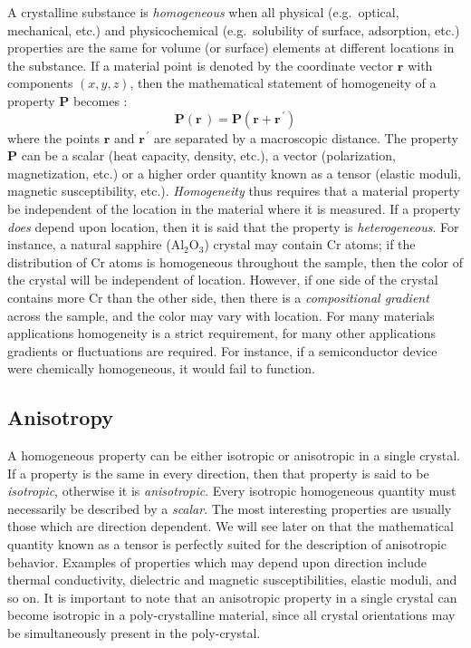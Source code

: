 A crystalline substance is \textit{homogeneous} when all physical (e.g.\ optical, mechanical, etc.)  and physicochemical (e.g.\ solubility of surface, adsorption, etc.)  properties are the same for volume (or surface) elements at different locations in the substance.  If a material point is denoted by the coordinate vector $\mathbf{r}$ with components $(x,y,z)$, then the mathematical statement of homogeneity of a property $\mathbf{P}$ becomes :
\begin{equation}
	\mathbf{P}(\mathbf{r}\,)=\mathbf{P}(\mathbf{r}+\mathbf{r}^{\,\prime})
\end{equation}
where the points $\mathbf{r}$ and $\mathbf{r}^{\,\prime}$ are separated by a macroscopic distance.  The property $\mathbf{P}$ can be a scalar (heat capacity, density, etc.), a vector (polarization, magnetization, etc.)  or a higher order quantity known as a tensor (elastic moduli, magnetic susceptibility, etc.). \textit{Homogeneity} thus requires that a material property be independent of the location in the material where it is measured.  If a property \textit{does} depend upon location, then it is said that the property is \textit{heterogeneous}.  For instance, a natural sapphire (Al$_2$O$_3$) crystal may contain Cr atoms; if the distribution of Cr atoms is homogeneous throughout the sample, then the color of the crystal will be independent of location.  However, if one side of the crystal contains more Cr than the other side, then there is a \textit{compositional gradient} across the sample, and the color may vary with location.  For many materials applications homogeneity is a strict requirement, for many other applications gradients or fluctuations are required.  For instance, if a semiconductor device were chemically homogeneous, it would fail to function.

\subsection{Anisotropy\label{ssec:anisotropy}}
A homogeneous property can be either isotropic or anisotropic in a single crystal.  If a property is the same in every direction, then that property is said to be \textit{isotropic}, otherwise it is \textit{anisotropic}.  Every isotropic homogeneous quantity must necessarily be described by a \textit{scalar}.  The most interesting properties are usually those which are direction dependent.  We will see later on that the mathematical quantity known as a tensor is perfectly suited for the description of anisotropic behavior.  Examples of properties which may depend upon direction include thermal conductivity, dielectric and magnetic susceptibilities, elastic moduli, and so on.  It is important to note that an anisotropic property in a single crystal can become isotropic in a poly-crystalline material, since all crystal orientations may be simultaneously present in the poly-crystal.

